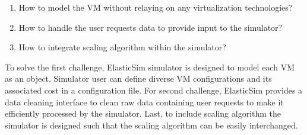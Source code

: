  \begin{enumerate}
   \item How to model the VM without relaying on any virtualization technologies?
   \item How to handle the user requests data to provide input to the simulator?
   \item How to integrate scaling algorithm within the simulator?
 \end{enumerate}

 To solve the first challenge, ElasticSim simulator is designed to model each VM as an object. Simulator user can define diverse VM configurations and its associated cost in a configuration file. For second challenge, ElasticSim provides a data cleaning interface to clean raw data containing user requests to make it efficiently processed by the simulator. Last, to include scaling algorithm the simulator is designed such that the scaling algorithm can be easily interchanged.

